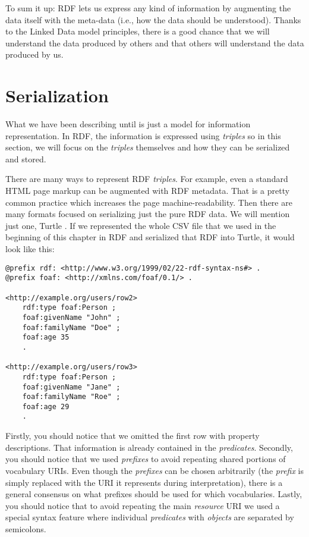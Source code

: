 To sum it up: RDF lets us express any kind of information by augmenting the data itself with the meta-data (i.e., how the data should be understood). Thanks to the Linked Data model principles, there is a good chance that we will understand the data produced by others and that others will understand the data produced by us.

\section{Serialization}

What we have been describing until is just a model for information representation. In RDF, the information is expressed using \emph{triples} so in this section, we will focus on the \emph{triples} themselves and how they can be serialized and stored.

There are many ways to represent RDF \emph{triples}. For example, even a standard HTML page markup can be augmented with RDF metadata. That is a pretty common practice which increases the page machine-readability. Then there are many formats focused on serializing just the pure RDF data. We will mention just one, Turtle \cite{turtle}. If we represented the whole CSV file that we used in the beginning of this chapter in RDF and serialized that RDF into Turtle, it would look like this:

\begin{verbatim}
@prefix rdf: <http://www.w3.org/1999/02/22-rdf-syntax-ns#> .
@prefix foaf: <http://xmlns.com/foaf/0.1/> .

<http://example.org/users/row2>
    rdf:type foaf:Person ; 
    foaf:givenName "John" ;
    foaf:familyName "Doe" ;
    foaf:age 35
    .
    
<http://example.org/users/row3>
    rdf:type foaf:Person ; 
    foaf:givenName "Jane" ;
    foaf:familyName "Roe" ;
    foaf:age 29
    .
\end{verbatim}

Firstly, you should notice that we omitted the first row with property descriptions. That information is already contained in the \emph{predicates}. Secondly, you should notice that we used \emph{prefixes} to avoid repeating shared portions of vocabulary URIs. Even though the \emph{prefixes} can be chosen arbitrarily (the \emph{prefix} is simply replaced with the URI it represents during interpretation), there is a general consensus on what prefixes should be used for which vocabularies. Lastly, you should notice that to avoid repeating the main \emph{resource} URI we used a special syntax feature where individual \emph{predicates} with \emph{objects} are separated by semicolons.

